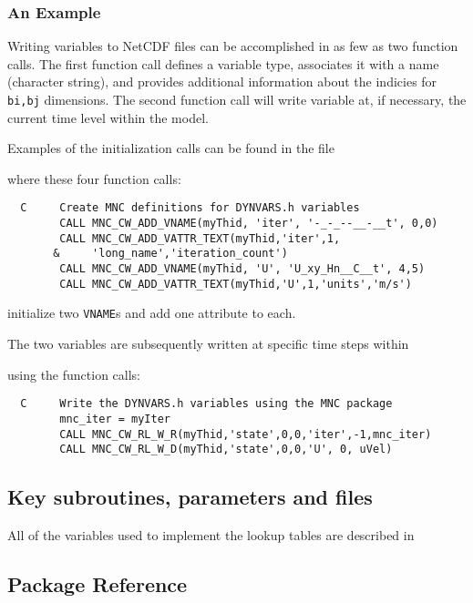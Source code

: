 \subsubsection{An Example}

Writing variables to NetCDF files can be accomplished in as few as two
function calls.  The first function call defines a variable type,
associates it with a name (character string), and provides additional
information about the indicies for \texttt{bi,bj} dimensions.  The
second function call will write variable at, if necessary, the
current time level within the model.

Examples of the initialization calls can be found in the file 
\begin{center}
\end{center}
where these four function calls: {\footnotesize
\begin{verbatim}
  C     Create MNC definitions for DYNVARS.h variables
        CALL MNC_CW_ADD_VNAME(myThid, 'iter', '-_-_--__-__t', 0,0)
        CALL MNC_CW_ADD_VATTR_TEXT(myThid,'iter',1,
       &     'long_name','iteration_count')
        CALL MNC_CW_ADD_VNAME(myThid, 'U', 'U_xy_Hn__C__t', 4,5)
        CALL MNC_CW_ADD_VATTR_TEXT(myThid,'U',1,'units','m/s')
\end{verbatim} }
{\noindent initialize two \texttt{VNAME}s and add one attribute to each.}
    
The two variables are subsequently written at specific time steps
within 
\begin{center}
\end{center}
using the function calls: {\footnotesize
\begin{verbatim}
  C     Write the DYNVARS.h variables using the MNC package
        mnc_iter = myIter
        CALL MNC_CW_RL_W_R(myThid,'state',0,0,'iter',-1,mnc_iter)
        CALL MNC_CW_RL_W_D(myThid,'state',0,0,'U', 0, uVel)
\end{verbatim} }


\subsection{Key subroutines, parameters and files}

All of the variables used to implement the lookup tables are described
in 



\subsection{Package Reference}

